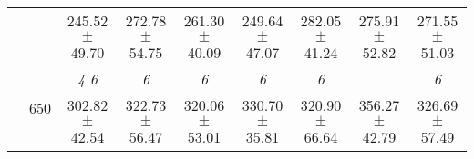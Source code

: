 \begin{table}[h]
{\begin{tabular}{
        ccccccccc}
 & & \cellcolor[HTML]{EFEFEF} 245.52 $\pm$ 49.70& \cellcolor[HTML]{EFEFEF} 272.78 $\pm$ 54.75& \cellcolor[HTML]{EFEFEF} 261.30 $\pm$ 40.09& \cellcolor[HTML]{EFEFEF} 249.64 $\pm$ 47.07& \cellcolor[HTML]{EFEFEF} 282.05 $\pm$ 41.24& \cellcolor[HTML]{EFEFEF} 275.91 $\pm$ 52.82& \cellcolor[HTML]{EFEFEF} 271.55 $\pm$ 51.03 \\ 
 & \multirow{2}{*}{650}& \textit{ 4 6 }& \textit{ 6 }& \textit{ 6 }& \textit{ 6 }& \textit{ 6 }& & \textit{ 6 } \\ 
 & & 302.82 $\pm$ 42.54& 322.73 $\pm$ 56.47& 320.06 $\pm$ 53.01& 330.70 $\pm$ 35.81& 320.90 $\pm$ 66.64& 356.27 $\pm$ 42.79& 326.69 $\pm$ 57.49 \\ \midrule 

        \bottomrule
        \end{tabular}%
        }

        \end{table}
        
